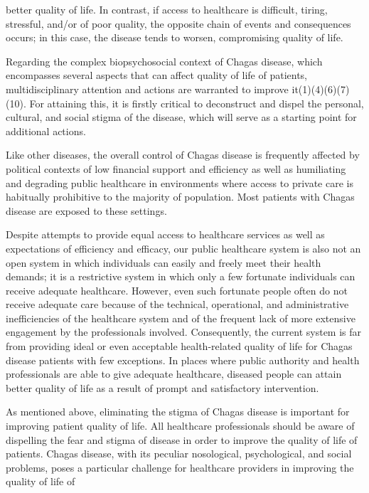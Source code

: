  better quality of life. In contrast, if access to healthcare is difficult, tiring,
 stressful, and/or of poor quality, the opposite chain of events and consequences occurs;
 in this case, the disease tends to worsen, compromising quality of life. \par Regarding the complex biopsychosocial context of Chagas disease, which encompasses
 several aspects that can affect quality of life of patients, multidisciplinary attention
 and actions are warranted to improve it(1)(4)(6)(7)(10). For attaining this, it is firstly critical
 to deconstruct and dispel the personal, cultural, and social stigma of the disease,
 which will serve as a starting point for additional actions.\par Like other diseases, the overall control of Chagas disease is frequently affected by
 political contexts of low financial support and efficiency as well as humiliating and
 degrading public healthcare in environments where access to private care is habitually
 prohibitive to the majority of population. Most patients with Chagas disease are exposed
 to these settings. \par Despite attempts to provide equal access to healthcare services as well as expectations
 of efficiency and efficacy, our public healthcare system is also not an open system in
 which individuals can easily and freely meet their health demands; it is a restrictive
 system in which only a few fortunate individuals can receive adequate healthcare.
 However, even such fortunate people often do not receive adequate care because of the
 technical, operational, and administrative inefficiencies of the healthcare system and
 of the frequent lack of more extensive engagement by the professionals involved.
 Consequently, the current system is far from providing ideal or even acceptable
 health-related quality of life for Chagas disease patients with few exceptions. In
 places where public authority and health professionals are able to give adequate
 healthcare, diseased people can attain better quality of life as a result of prompt and
 satisfactory intervention. \par As mentioned above, eliminating the stigma of Chagas disease is important for improving
 patient quality of life. All healthcare professionals should be aware of dispelling the
 fear and stigma of disease in order to improve the quality of life of patients. Chagas
 disease, with its peculiar nosological, psychological, and social problems, poses a
 particular challenge for healthcare providers in improving the quality of life of
